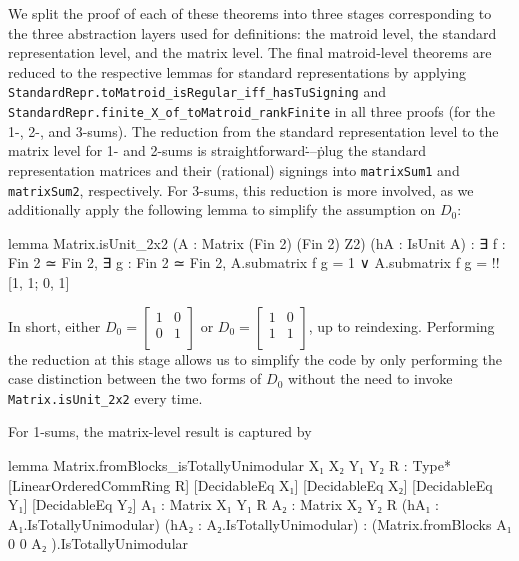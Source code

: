 We split the proof of each of these theorems into three stages corresponding to the three abstraction layers used for definitions: the matroid level, the standard representation level, and the matrix level. The final matroid-level theorems are reduced to the respective lemmas for standard representations by applying \texttt{StandardRepr.toMatroid\_isRegular\_iff\_hasTuSigning} and \texttt{StandardRepr.finite\_X\_of\_toMatroid\_rankFinite} in all three proofs (for the 1-, 2-, and 3-sums). The reduction from the standard representation level to the matrix level for 1- and 2-sums is straightforward\.---\.plug the standard representation matrices and their (rational) signings into \texttt{matrixSum1} and \texttt{matrixSum2}, respectively. For 3-sums, this reduction is more involved, as we additionally apply the following lemma to simplify the assumption on $D_{0}$:
\begin{leancode}
lemma Matrix.isUnit_2x2
    (A : Matrix (Fin 2) (Fin 2) Z2)
    (hA : IsUnit A) :
  ∃ f : Fin 2 ≃ Fin 2,
  ∃ g : Fin 2 ≃ Fin 2,
    A.submatrix f g = 1 ∨
    A.submatrix f g = !![1, 1; 0, 1]
\end{leancode}
In short, either $D_{0} = \begin{bmatrix} 1 & 0 \\ 0 & 1 \\ \end{bmatrix}$ or $D_{0} = \begin{bmatrix} 1 & 0 \\ 1 & 1 \\ \end{bmatrix}$, up to reindexing. Performing the reduction at this stage allows us to simplify the code by only performing the case distinction between the two forms of $D_{0}$ without the need to invoke \texttt{Matrix.isUnit\_2x2} every time.

For 1-sums, the matrix-level result is captured by
\begin{leancode}
lemma Matrix.fromBlocks_isTotallyUnimodular
    {X₁ X₂ Y₁ Y₂ R : Type*}
    [LinearOrderedCommRing R]
    [DecidableEq X₁] [DecidableEq X₂]
    [DecidableEq Y₁] [DecidableEq Y₂]
    {A₁ : Matrix X₁ Y₁ R} {A₂ : Matrix X₂ Y₂ R}
    (hA₁ : A₁.IsTotallyUnimodular)
    (hA₂ : A₂.IsTotallyUnimodular) :
    (Matrix.fromBlocks A₁ 0 0 A₂
    ).IsTotallyUnimodular
\end{leancode}

